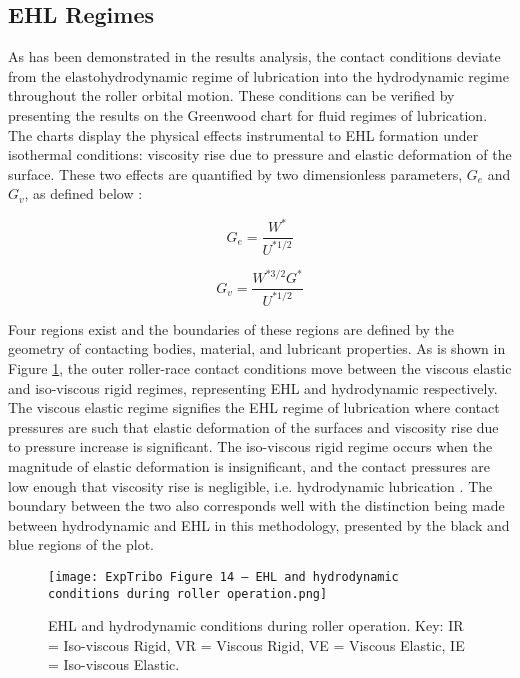 \subsection{EHL Regimes} \label{Greenwood EHL Regimes}

As has been demonstrated in the results analysis, the contact conditions deviate from the elastohydrodynamic regime of lubrication into the hydrodynamic regime throughout the roller orbital motion. These conditions can be verified by presenting the results on the Greenwood chart for fluid regimes of lubrication. The charts display the physical effects instrumental to EHL formation under isothermal conditions: viscosity rise due to pressure and elastic deformation of the surface. These two effects are quantified by two dimensionless parameters, $G_e$ and $G_v$, as defined below \cite{Gohar1988}: 

\begin{equation}\label{GoharGe}
	G_e=\frac{W^*}{U^{* 1 / 2}}
\end{equation}

\begin{equation}\label{GoharGv}
	G_v=\frac{W^{* 3 / 2} G^*}{U^{* 1 / 2}}
\end{equation}

Four regions exist and the boundaries of these regions are defined by the geometry of contacting bodies, material, and lubricant properties. As is shown in Figure \ref{EHL and hydrodynamic conditions during roller operation}, the outer roller-race contact conditions move between the viscous elastic and iso-viscous rigid regimes, representing EHL and hydrodynamic respectively. The viscous elastic regime signifies the EHL regime of lubrication where contact pressures are such that elastic deformation of the surfaces and viscosity rise due to pressure increase is significant. The iso-viscous rigid regime occurs when the magnitude of elastic deformation is insignificant, and the contact pressures are low enough that viscosity rise is negligible, i.e. hydrodynamic lubrication \cite{Hamrock1980}. The boundary between the two also corresponds well with the distinction being made between hydrodynamic and EHL in this methodology, presented by the black and blue regions of the plot.

\begin{figure}
	\centering
	\texttt{[image: ExpTribo Figure 14 – EHL and hydrodynamic conditions during roller operation.png]}
	\caption{EHL and hydrodynamic conditions during roller operation. Key: IR = Iso-viscous Rigid, VR = Viscous Rigid, VE = Viscous Elastic, IE = Iso-viscous Elastic.}
	\label{EHL and hydrodynamic conditions during roller operation}
\end{figure} 

